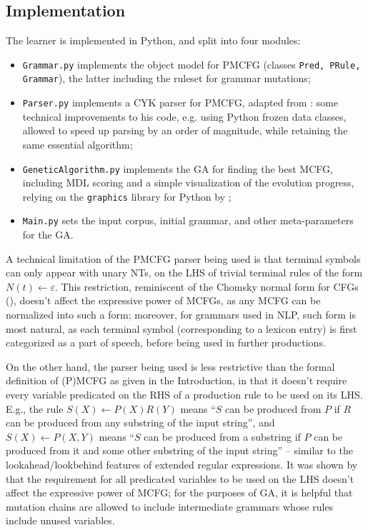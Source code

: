 \documentclass{article}
\begin{document}
\subsection{Implementation}

The learner is implemented in Python, and split into four modules:
\begin{itemize}
  \item \texttt{Grammar.py} implements the object model for PMCFG (classes \texttt{Pred, PRule, Grammar}),
    the latter including the ruleset for grammar mutations;
  \item \texttt{Parser.py} implements a CYK parser for PMCFG, adapted from \cite{keinan}:
    some technical improvements to his code, e.g. using Python frozen data classes,
    allowed to speed up parsing by an order of magnitude, while retaining the same essential algorithm;
  \item \texttt{GeneticAlgorithm.py} implements the GA for finding the best MCFG, including
    MDL scoring and a simple visualization of the evolution progress,
    relying on the \texttt{graphics} library for Python by \cite{zelle};
  \item \texttt{Main.py} sets the input corpus, initial grammar, and other meta-parameters for the GA.
\end{itemize}

A technical limitation of the PMCFG parser being used is that terminal symbols can only appear
with unary NTs, on the LHS of trivial terminal rules of the form $N(t)\leftarrow\varepsilon$.
This restriction, reminiscent of the Chomsky normal form for CFGs (\cite{chomsky1959}),
doesn't affect the expressive power of MCFGs, as any MCFG can be normalized into such a form;
moreover, for grammars used in NLP, such form is most natural, as each terminal symbol
(corresponding to a lexicon entry) is first categorized as a part of speech,
before being used in further productions.

On the other hand, the parser being used is less restrictive than the formal definition of (P)MCFG
as given in the Introduction,
in that it doesn't require every variable predicated on the RHS of a production rule to be used on its LHS.
E.g., the rule $S(X) \leftarrow P(X)R(Y)$ means ``$S$ can be produced from $P$ if $R$ can be produced
from any substring of the input string'', and $S(X) \leftarrow P(X,Y)$ means ``$S$ can be produced from
a substring if $P$ can be produced from it and some other substring of the input string'' --
similar to the lookahead/lookbehind features of extended regular expressions.
It was shown by \cite{kallmeyer} that the requirement for all predicated variables to be used on the LHS
doesn't affect the expressive power of MCFG; for the purposes of GA, it is helpful
that mutation chains are allowed to include intermediate grammars whose rules include unused variables.
\end{document}

